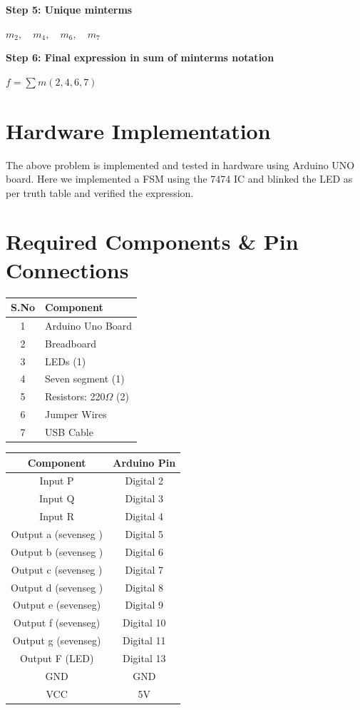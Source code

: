 \documentclass[a4paper,12pt]{article}
\begin{document}
\textbf{Step 5: Unique minterms}

$
m_2, \quad m_4, \quad m_6, \quad m_7
$

\textbf{Step 6: Final expression in sum of minterms notation}

$
f = \sum m(2, 4, 6, 7)
$

\section*{\textbf{Hardware Implementation}}
The above problem is implemented and tested in hardware using Arduino UNO board. Here we implemented a FSM using the 7474 IC and blinked the LED as per truth table and verified the expression.
\section*{Required Components \& Pin Connections}
\begin{center}
\begin{minipage}{0.45\textwidth}
\begin{table}[H]
\centering
\begin{tabular}{|c|l|}
\hline
\textbf{S.No} & \textbf{Component} \\ \hline
1 & Arduino Uno Board \\
2 & Breadboard \\
3 & LEDs (1) \\
4 & Seven segment (1) \\
5 & Resistors: 220$\Omega$ (2) \\
6 & Jumper Wires \\
7 & USB Cable \\
\hline
\end{tabular}
\end{table}
\end{minipage}
\hspace{0.05\textwidth}
\begin{minipage}{0.45\textwidth}
\begin{table}[H]
\centering
\begin{tabular}{|c|c|}
\hline
\textbf{Component} & \textbf{Arduino Pin} \\ \hline
Input P  & Digital 2 \\
Input Q  & Digital 3 \\
Input R  & Digital 4 \\
Output a (sevenseg ) & Digital 5 \\
Output b (sevenseg ) & Digital 6 \\
Output c (sevenseg ) & Digital 7 \\
Output d (sevenseg ) & Digital 8\\
Output e (sevenseg)  & Digital 9\\
Output f (sevenseg) & Digital 10\\
Output g (sevenseg) & Digital 11\\
Output F (LED) & Digital 13 \\
GND & GND \\
VCC & 5V \\
\hline
\end{tabular}
\end{table}
\end{minipage}
\end{center}
\end{document}
